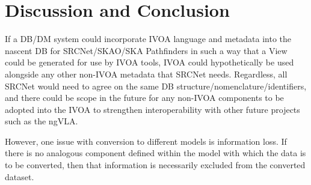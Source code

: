 \section{Discussion and Conclusion}\label{sec:discussion}

If a DB/DM system could incorporate IVOA language and metadata into the nascent DB for SRCNet/SKAO/SKA Pathfinders in such a way that a View could be generated for use by IVOA tools, IVOA could hypothetically be used alongside any other non-IVOA metadata that SRCNet needs.  Regardless, all SRCNet would need to agree on the same DB structure/nomenclature/identifiers, and there could be scope in the future for any non-IVOA components to be adopted into the IVOA to strengthen interoperability with other future projects such as the ngVLA.

However, one issue with conversion to different models is information loss. 
If there is no analogous component defined within the model with which the data is to be converted, then that information is necessarily excluded from the converted dataset. 

